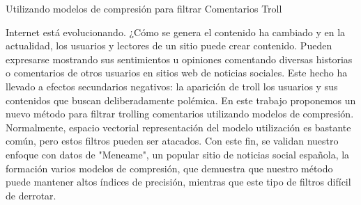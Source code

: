 Utilizando modelos de compresión para filtrar Comentarios Troll

Internet está evolucionando. ¿Cómo se genera el contenido ha cambiado y en la actualidad, los usuarios y lectores de un sitio puede crear contenido. Pueden expresarse mostrando sus sentimientos u opiniones comentando diversas historias o comentarios de otros usuarios en sitios web de noticias sociales. Este hecho ha llevado a efectos secundarios negativos: la aparición de troll los usuarios y sus contenidos que buscan deliberadamente polémica. En este trabajo proponemos un nuevo método para filtrar trolling comentarios utilizando modelos de compresión. Normalmente, espacio vectorial representación del modelo utilización es bastante común, pero estos filtros pueden ser atacados. Con este fin, se validan nuestro enfoque con datos de "Meneame", un popular sitio de noticias social española, la formación varios modelos de compresión, que demuestra que nuestro método puede mantener altos índices de precisión, mientras que este tipo de filtros difícil de derrotar.
